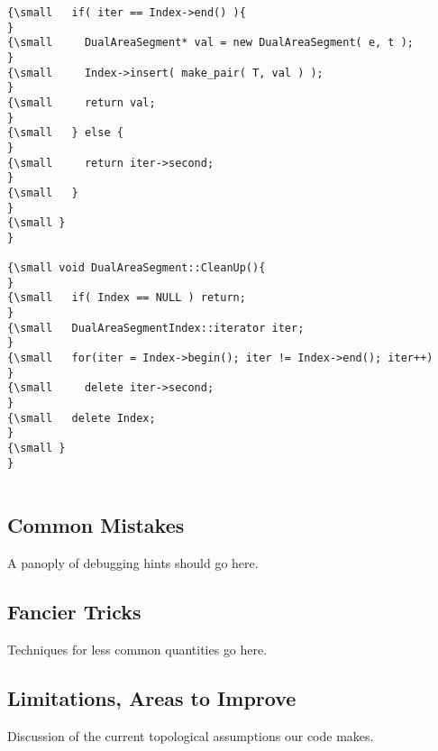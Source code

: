 \begin{verbatim}
{\small   if( iter == Index->end() ){
}
{\small     DualAreaSegment* val = new DualAreaSegment( e, t );
}
{\small     Index->insert( make_pair( T, val ) );
}
{\small     return val;
}
{\small   } else {
}
{\small     return iter->second;
}
{\small   }
}
{\small }
}
 
{\small void DualAreaSegment::CleanUp(){
}
{\small   if( Index == NULL ) return;
}
{\small   DualAreaSegmentIndex::iterator iter;
}
{\small   for(iter = Index->begin(); iter != Index->end(); iter++)
}
{\small     delete iter->second;
}
{\small   delete Index;
}
{\small }
}
 
\end{verbatim}

\subsection*{Common Mistakes}

A panoply of debugging hints should go here.

\subsection*{Fancier Tricks}

Techniques for less common quantities go here.

\subsection*{Limitations, Areas to Improve}

Discussion of the current topological assumptions our code makes.


%
